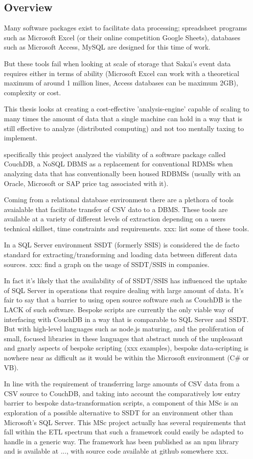 \subsection{Overview}
Many software packages exist to facilitate data processing; spreadsheet programs such as Microsoft Excel (or their online competition Google Sheets), databases such as Microsoft Access, MySQL are designed for this time of work.

But these tools fail when looking at scale of storage that Sakai's event data requires either in terms of ability (Microsoft Excel can work with a theoretical maximum of around 1 million lines, Access databases can be maximum 2GB), complexity or cost.

This thesis looks at creating a cost-effective 'analysis-engine' capable of scaling to many times the amount of data that a single machine can hold in a way that is still effective to analyze (distributed computing) and not too mentally taxing to implement.

specifically this project analyzed the viability of a software package called CouchDB, a NoSQL DBMS as a replacement for conventional RDMSs when analyzing data that has conventionally been housed RDBMSs (usually with an Oracle, Microsoft or SAP price tag associated with it).

Coming from a relational database environment there are a plethora of tools avaialable that facilitate transfer of CSV dato to a DBMS. These tools are available at a variety of different levels of extraction depending on a users technical skillset, time constraints and requirements. xxx: list some of these tools.

In a SQL Server environment SSDT (formerly SSIS) is considered the de facto standard for extracting/transforming and loading data between different data sources. xxx: find a graph on the usage of SSDT/SSIS in companies.

In fact it's likely that the availability of of SSDT/SSIS has influenced the uptake of SQL Server in operations that require dealing with large amount of data. It's fair to say that a barrier to using open source software such as CouchDB is the LACK of such software. Bespoke scripts are currently the only viable way of interfacing with CouchDB in a way that is comparable to SQL Server and SSDT. But with high-level languages such as node.js maturing, and the proliferation of small, focused libraries in these languages that abstract much of the unpleasant and gnarly aspects of bespoke scripting (xxx examples), bespoke data-scripting is nowhere near as difficult as it would be within the Microsoft environment (C\# or VB).

In line with the requirement of transferring large amounts of CSV data from a CSV source to CouchDB, and taking into account the comparatively low entry barrier to bespoke data-transformation scripts, a component of this MSc is an exploration of a possible alternative to SSDT for an environment other than Microsoft's SQL Server. This MSc project actually has several requirements that fall within the ETL spectrum that such a framework could easily be adapted to handle in a generic way. The framework has been published as an npm library and is available at ..., with source code available at github somewhere xxx.